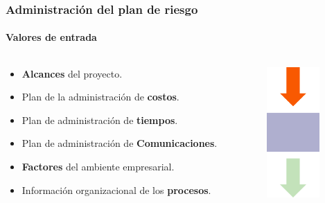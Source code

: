 \begin{frame}
\frametitle{Administración del plan de riesgo}
\framesubtitle{Valores de entrada}

\begin{columns}
	\begin{column}{0.8\textwidth}
\begin{itemize}
    \item<1-> \textbf{Alcances} del proyecto.
    \item<2-> Plan de la administración de \textbf{costos}.
    \item<3-> Plan de administración de \textbf{tiempos}.
    \item<4-> Plan de administración de \textbf{Comunicaciones}.
    \item<5-> \textbf{Factores} del ambiente empresarial.
    \item<6-> Información organizacional de los \textbf{procesos}.
\end{itemize}
	\end{column}
	\begin{column}{0.2\textwidth}
		\includegraphics[width=2cm]{img/input}
	\end{column}
\end{columns}
\end{frame}


